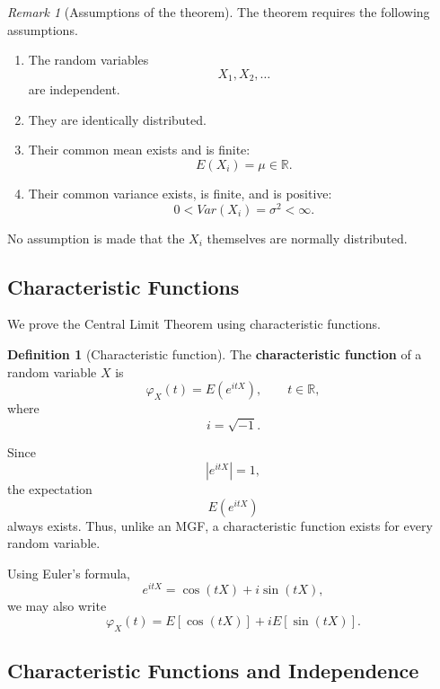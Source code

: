 \documentclass[11pt]{article}
\theoremstyle{definition}
\newtheorem{definition}{Definition}
\theoremstyle{plain}
\theoremstyle{remark}
\newtheorem{remark}{Remark}
\begin{document}
\begin{remark}[Assumptions of the theorem]
The theorem requires the following assumptions.

\begin{enumerate}[label=(\arabic*)]

\item The random variables
\[
X_1,X_2,\ldots
\]
are independent.

\item They are identically distributed.

\item Their common mean exists and is finite:
\[
E(X_i)=\mu\in\mathbb{R}.
\]

\item Their common variance exists, is finite, and is positive:
\[
0<Var(X_i)=\sigma^2<\infty.
\]

\end{enumerate}

No assumption is made that the $X_i$ themselves are normally
distributed.
\end{remark}


\subsection*{Characteristic Functions}

We prove the Central Limit Theorem using characteristic functions.

\begin{definition}[Characteristic function]
The \textbf{characteristic function} of a random variable $X$ is
\[
\varphi_X(t)
=
E\left(e^{itX}\right),
\qquad
t\in\mathbb{R},
\]
where
\[
i=\sqrt{-1}.
\]
\end{definition}

Since
\[
|e^{itX}|=1,
\]
the expectation
\[
E(e^{itX})
\]
always exists. Thus, unlike an MGF, a characteristic function exists for
every random variable.

Using Euler's formula,
\[
e^{itX}
=
\cos(tX)+i\sin(tX),
\]
we may also write
\[
\varphi_X(t)
=
E[\cos(tX)]
+
iE[\sin(tX)].
\]


\subsection*{Characteristic Functions and Independence}
\end{document}
